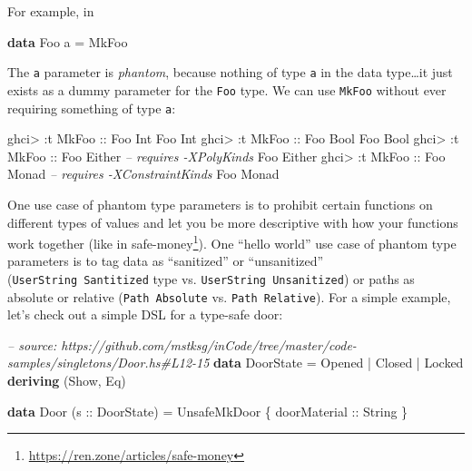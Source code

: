 \documentclass[]{article}
\newenvironment{Shaded}{}{}
\newcommand{\KeywordTok}[1]{\textcolor[rgb]{0.00,0.44,0.13}{\textbf{#1}}}
\newcommand{\DataTypeTok}[1]{\textcolor[rgb]{0.56,0.13,0.00}{#1}}
\newcommand{\CommentTok}[1]{\textcolor[rgb]{0.38,0.63,0.69}{\textit{#1}}}
\newcommand{\OtherTok}[1]{\textcolor[rgb]{0.00,0.44,0.13}{#1}}
\newcommand{\FunctionTok}[1]{\textcolor[rgb]{0.02,0.16,0.49}{#1}}
\newcommand{\NormalTok}[1]{#1}
\renewcommand{\href}[2]{#2\footnote{\url{#1}}}
\begin{document}
For example, in

\begin{Shaded}
\begin{Highlighting}[]
\KeywordTok{data} \DataTypeTok{Foo}\NormalTok{ a }\FunctionTok{=} \DataTypeTok{MkFoo}
\end{Highlighting}
\end{Shaded}

The \texttt{a} parameter is \emph{phantom}, because nothing of type \texttt{a}
in the data type\ldots{}it just exists as a dummy parameter for the \texttt{Foo}
type. We can use \texttt{MkFoo} without ever requiring something of type
\texttt{a}:

\begin{Shaded}
\begin{Highlighting}[]
\NormalTok{ghci}\FunctionTok{>} \FunctionTok{:}\NormalTok{t }\DataTypeTok{MkFoo}\OtherTok{ ::} \DataTypeTok{Foo} \DataTypeTok{Int}
\DataTypeTok{Foo} \DataTypeTok{Int}
\NormalTok{ghci}\FunctionTok{>} \FunctionTok{:}\NormalTok{t }\DataTypeTok{MkFoo}\OtherTok{ ::} \DataTypeTok{Foo} \DataTypeTok{Bool}
\DataTypeTok{Foo} \DataTypeTok{Bool}
\NormalTok{ghci}\FunctionTok{>} \FunctionTok{:}\NormalTok{t }\DataTypeTok{MkFoo}\OtherTok{ ::} \DataTypeTok{Foo} \DataTypeTok{Either}        \CommentTok{-- requires -XPolyKinds}
\DataTypeTok{Foo} \DataTypeTok{Either}
\NormalTok{ghci}\FunctionTok{>} \FunctionTok{:}\NormalTok{t }\DataTypeTok{MkFoo}\OtherTok{ ::} \DataTypeTok{Foo} \DataTypeTok{Monad}         \CommentTok{-- requires -XConstraintKinds}
\DataTypeTok{Foo} \DataTypeTok{Monad}
\end{Highlighting}
\end{Shaded}

One use case of phantom type parameters is to prohibit certain functions on
different types of values and let you be more descriptive with how your
functions work together (like in
\href{https://ren.zone/articles/safe-money}{safe-money}). One ``hello world''
use case of phantom type parameters is to tag data as ``sanitized'' or
``unsanitized'' (\texttt{UserString\ \textquotesingle{}Santitized} type vs.
\texttt{UserString\ \textquotesingle{}Unsanitized}) or paths as absolute or
relative (\texttt{Path\ \textquotesingle{}Absolute} vs.
\texttt{Path\ \textquotesingle{}Relative}). For a simple example, let's check
out a simple DSL for a type-safe door:

\begin{Shaded}
\begin{Highlighting}[]
\CommentTok{-- source: https://github.com/mstksg/inCode/tree/master/code-samples/singletons/Door.hs#L12-15}
\KeywordTok{data} \DataTypeTok{DoorState} \FunctionTok{=} \DataTypeTok{Opened} \FunctionTok{|} \DataTypeTok{Closed} \FunctionTok{|} \DataTypeTok{Locked}
  \KeywordTok{deriving}\NormalTok{ (}\DataTypeTok{Show}\NormalTok{, }\DataTypeTok{Eq}\NormalTok{)}

\KeywordTok{data} \DataTypeTok{Door}\NormalTok{ (}\OtherTok{s ::} \DataTypeTok{DoorState}\NormalTok{) }\FunctionTok{=} \DataTypeTok{UnsafeMkDoor}\NormalTok{ \{}\OtherTok{ doorMaterial ::} \DataTypeTok{String}\NormalTok{ \}}
\end{Highlighting}
\end{Shaded}
\end{document}
